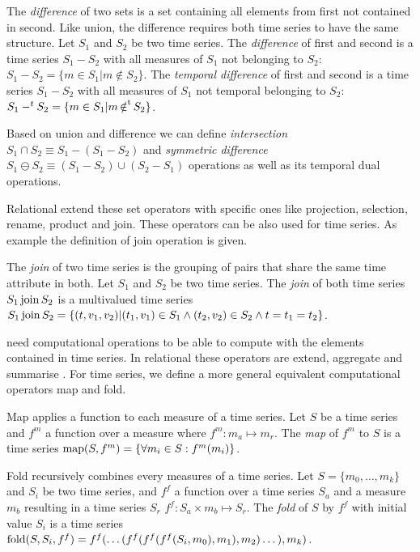 The \emph{difference} of two sets is a set containing all elements
from first not contained in second. Like union, the difference
requires both time series to have the same structure. %
Let $S_1$ and $S_2$ be two time series. The \emph{difference} of first
and second is a time series $S_1 - S_2$ with all measures of $S_1$ not
belonging to $S_2$: $S_1 - S_2 = \{ m \in S_1 | m \notin S_2
\}$. The \emph{temporal difference} of first and second is a time
series $S_1 - S_2$ with all measures of $S_1$ not temporal belonging
to $S_2$: $S_1 -^t S_2 = \{ m \in S_1 | m \operatorname*{\notin^t} S_2 \}$.


Based on union and difference we can define \emph{intersection} $S_1\cap
S_2 \equiv S_1 - (S_1 - S_2)$ and \emph{symmetric difference} $S_1 \ominus
S_2 \equiv (S_1 - S_2) \cup (S_2 - S_1)$ operations as well as its
temporal dual operations.


Relational  extend these set operators with specific ones like
projection, selection, rename, product and join. These operators can
be also used for time series. As example the definition of join
operation is given.


The \emph{join} of two time series is the grouping of pairs that share
the same time attribute in both.  Let $S_1$ and $S_2$ be two time series.
The \emph{join} of both time series $S_1 \operatorname*{join} S_2$ is a multivalued
time series $S_1 \operatorname*{join} S_2 = \{ (t,v_1,v_2) | (t_1,v_1) \in S_1 \wedge
(t_2,v_2) \in S_2 \wedge t=t_1=t_2 \}$.


 need computational operations to be able to compute with
the elements contained in time series. In relational  these
operators are extend, aggregate and summarise
\cite{date:introduction}. For time series, we define a more general
equivalent computational operators map and fold.


Map applies a function to each measure of a time series.  Let $S$ be a
time series and $f^m$ a function over a measure where $f^m:m_a\mapsto
m_r$. The \emph{map} of $f^m$ to $S$ is a time series $\operatorname*{map}(S,f^m) =
\{\forall m_i\in S : f^m(m_i) \}$.

Fold recursively combines every measures of a time series.  Let
$S=\{m_0, \dotsc, m_k\}$ and $S_i$ be two time series, and $f^f$ a
function over a time series $S_a$ and a measure $m_b$ resulting in a
time series $S_r$ $f^f: S_a \times m_b \mapsto S_r$. The \emph{fold}
of $S$ by $f^f$ with initial value $S_i$ is a time series
$\operatorname*{fold}(S,S_i,f^f) = f^f(\dots( f^f(f^f(f^f(S_i,m_0),\allowbreak
m_1),\allowbreak m_2 )\dots),\allowbreak m_k)$.



